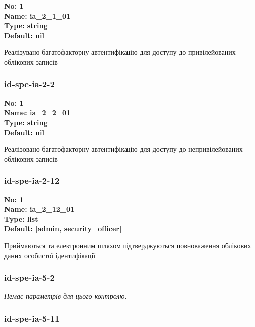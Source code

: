 \documentclass{article}
\begin{document}
\vspace{10pt}
{\footnotesize\bfseries
No: 1\\
Name: ia\_\allowbreak{}2\_\allowbreak{}1\_\allowbreak{}01\\
Type: string\\
Default: nil
}

{\footnotesize Реалізувано багатофакторну автентифікацію для доступу до привілейованих облікових записів}




\subsubsection{id-spe-ia-2-2}


\vspace{10pt}
{\footnotesize\bfseries
No: 1\\
Name: ia\_\allowbreak{}2\_\allowbreak{}2\_\allowbreak{}01\\
Type: string\\
Default: nil
}

{\footnotesize Реалізовано багатофакторну автентифікацію для доступу до непривілейованих облікових записів}




\subsubsection{id-spe-ia-2-12}


\vspace{10pt}
{\footnotesize\bfseries
No: 1\\
Name: ia\_\allowbreak{}2\_\allowbreak{}12\_\allowbreak{}01\\
Type: list\\
Default: [\textquotedbl{}admin\textquotedbl{}, \textquotedbl{}security\_\allowbreak{}officer\textquotedbl{}]
}

{\footnotesize Приймаються та електронним шляхом підтверджуються повноваження облікових даних особистої ідентифікації}




\subsubsection{id-spe-ia-5-2}


\vspace{10pt}
\textit{Немає параметрів для цього контролю.}
\vspace{10pt}


\subsubsection{id-spe-ia-5-11}
\end{document}
